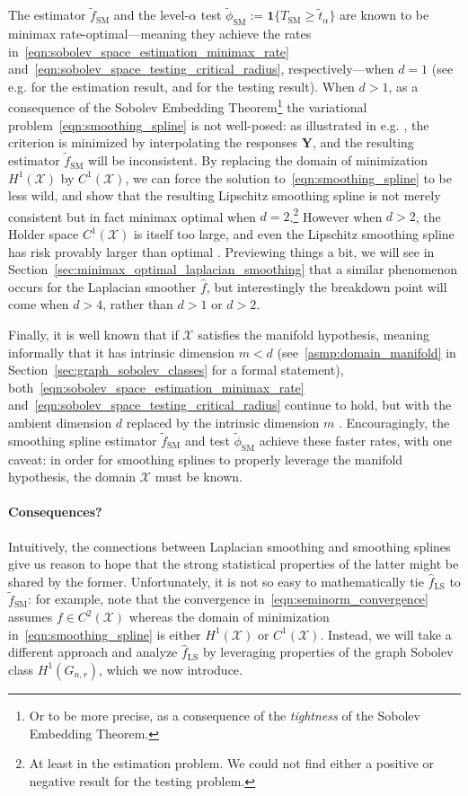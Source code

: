 \documentclass[twoside]{article}
\newcommand{\1}{\mathbf{1}}
\newcommand{\Xset}{\mathcal{X}}
\newcommand{\wt}[1]{\widetilde{#1}}
\newcommand{\wh}[1]{\widehat{#1}}
\newcommand{\LS}{\mathrm{LS}}
\newcommand{\SM}{\mathrm{SM}}
\theoremstyle{definition}
\theoremstyle{remark}
\begin{document}
The estimator $\wt{f}_{\SM}$ and the level-$\alpha$ test $\wt{\phi}_{\SM} := \1\{T_{\SM} \geq \wt{t}_{\alpha}\}$ are known to be minimax rate-optimal---meaning they achieve the rates in~\eqref{eqn:sobolev_space_estimation_minimax_rate} and~\eqref{eqn:sobolev_space_testing_critical_radius}, respectively---when $d = 1$ (see e.g. \cite{vandergeer2000} for the estimation result, and \cite{liu2019} for the testing result). When $d > 1$, as a consequence of the Sobolev Embedding Theorem\footnote{Or to be more precise, as a consequence of the \emph{tightness} of the Sobolev Embedding Theorem.} the variational problem~\eqref{eqn:smoothing_spline} is not well-posed: as illustrated in e.g. \cite{green93}, the criterion is minimized by interpolating the responses $\mathbf{Y}$, and the resulting estimator $\wt{f}_{\SM}$ will be inconsistent. By replacing the domain of minimization $H^1(\Xset)$ by $C^1(\Xset)$, we can force the solution to~\eqref{eqn:smoothing_spline} to be less wild, and \cite{birge1993} show that the resulting Lipschitz smoothing spline is not merely consistent but in fact minimax optimal when $d = 2$.\footnote{At least in the estimation problem. We could not find either a positive or negative result for the testing problem.} However when $d > 2$, the Holder space $C^1(\Xset)$ is itself too large, and even the Lipschitz smoothing spline has risk provably larger than optimal \cite{birge1993}. Previewing things a bit, we will see in Section~\ref{sec:minimax_optimal_laplacian_smoothing} that a similar phenomenon occurs for the Laplacian smoother $\wh{f}$, but interestingly the breakdown point will come when $d > 4$, rather than $d > 1$ or $d > 2$.

Finally, it is well known that if $\Xset$ satisfies the manifold hypothesis, meaning informally that it has intrinsic dimension $m < d$ (see~\ref{asmp:domain_manifold} in Section~\ref{sec:graph_sobolev_classes} for a formal statement), both~\eqref{eqn:sobolev_space_estimation_minimax_rate} and~\eqref{eqn:sobolev_space_testing_critical_radius} continue to hold, but with the ambient dimension $d$ replaced by the intrinsic dimension $m$ \citep{bickel2007,ingster2000}. Encouragingly, the smoothing spline estimator $\wt{f}_{\SM}$ and test $\wt{\phi}_{\SM}$ achieve these faster rates, with one caveat: in order for smoothing splines to properly leverage the manifold hypothesis, the domain $\Xset$ must be known.

\paragraph{Consequences?} Intuitively, the connections between Laplacian smoothing and smoothing splines give us reason to hope that the strong statistical properties of the latter might be shared by the former. Unfortunately, it is not so easy to mathematically tie $\wh{f}_{\LS}$ to $\wt{f}_{\SM}$: for example, note that the convergence in~\eqref{eqn:seminorm_convergence} assumes $f \in C^2(\Xset)$ whereas the domain of minimization in~\eqref{eqn:smoothing_spline} is either $H^1(\Xset)$ or $C^1(\Xset)$. Instead, we will take a different approach and analyze $\wh{f}_{\LS}$ by leveraging properties of the graph Sobolev class $H^1(G_{n,r})$, which we now introduce.
\end{document}
